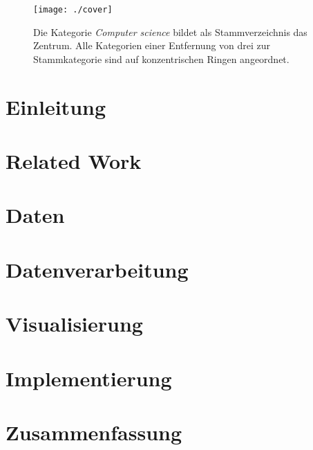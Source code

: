\begin{figure}
\centering
\texttt{[image: ./cover]}
\caption{Die Kategorie \textit{Computer science} bildet als Stammverzeichnis das Zentrum. Alle Kategorien einer Entfernung von drei zur Stammkategorie sind auf konzentrischen Ringen angeordnet.}
\label{fig:cover}
\end{figure}

\tableofcontents


\cleardoublepage
{} %


\chapter{Einleitung}
\label{chap:einleitung}


\chapter{Related Work}
\label{chap:related_work}


\chapter{Daten}
\label{chap:daten}


\chapter{Datenverarbeitung}
\label{chap:daten_ver}


\chapter{Visualisierung}
\label{chap:visualization}


\chapter{Implementierung}
\label{chap:Implementierung}


\chapter{Zusammenfassung}
\label{chap:Zusammenfassung}


